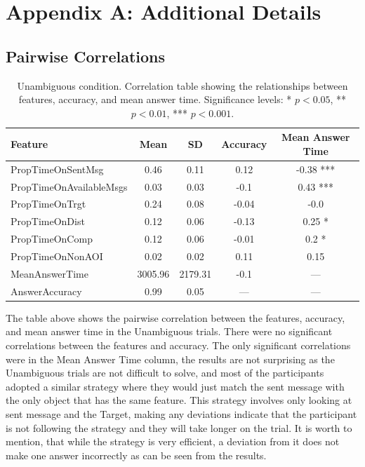 \chapter{Appendix A: Additional Details}
\label{appendix:a}
\section{Pairwise Correlations}
\label{sec:pairwise_corr_unambiguous}

\begin{table}[h!]
\centering
\begin{tabular}{|l|c|c|c|c|}
\hline
\textbf{Feature} & \textbf{Mean} & \textbf{SD} & \textbf{Accuracy} & \textbf{Mean Answer Time} \\ \hline
PropTimeOnSentMsg & 0.46 & 0.11 & 0.12 & -0.38 *** \\ \hline
PropTimeOnAvailableMsgs & 0.03 & 0.03 & -0.1 & 0.43 *** \\ \hline
PropTimeOnTrgt & 0.24 & 0.08 & -0.04 & -0.0 \\ \hline
PropTimeOnDist & 0.12 & 0.06 & -0.13 & 0.25 * \\ \hline
PropTimeOnComp & 0.12 & 0.06 & -0.01 & 0.2 * \\ \hline
PropTimeOnNonAOI & 0.02 & 0.02 & 0.11 & 0.15 \\ \hline
MeanAnswerTime & 3005.96 & 2179.31 & -0.1 & --- \\ \hline
AnswerAccuracy & 0.99 & 0.05 & --- & --- \\ \hline
\end{tabular}
\caption{Unambiguous condition. Correlation table showing the relationships between features, accuracy, and mean answer time. Significance levels: * $p < 0.05$, ** $p < 0.01$, *** $p < 0.001$.}
\label{tab:feature_summary}
\end{table}

The table above shows the pairwise correlation between the features, accuracy, and mean answer time in the Unambiguous trials. There were no significant correlations between the features and accuracy. The only significant correlations were in the Mean Answer Time column, the results are not surprising as the Unambiguous trials are not difficult to solve, and most of the participants adopted a similar strategy where they would just match the sent message with the only object that has the same feature. This strategy involves only looking at sent message and the Target, making any deviations indicate that the participant is not following the strategy and they will take longer on the trial. It is worth to mention, that while the strategy is very efficient, a deviation from it does not make one answer incorrectly as can be seen from the results.

